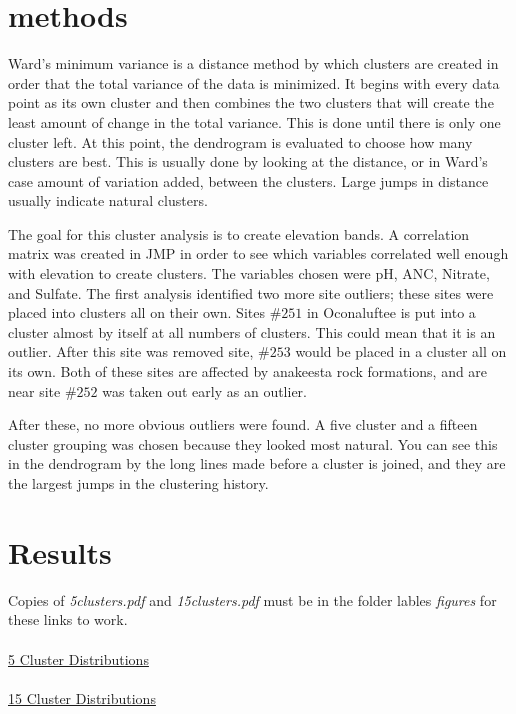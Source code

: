 \documentclass[11pt]{article} %
\begin{document}
\section{methods}
Ward’s minimum variance is a distance method by which clusters are created in order that the total variance of the data is minimized.  It begins with every data point as its own cluster and then combines the two clusters that will create the least amount of change in the total variance.  This is done until there is only one cluster left.  At this point, the dendrogram is evaluated to choose how many clusters are best.  This is usually done by looking at the distance, or in Ward’s case amount of variation added, between the clusters.  Large jumps in distance usually indicate natural clusters.

The goal for this cluster analysis is to create elevation bands.  A correlation matrix was created in JMP in order to see which variables correlated well enough with elevation to create clusters.  The variables chosen were pH, ANC, Nitrate, and Sulfate.   The first analysis identified two more site outliers; these sites were placed into clusters all on their own.  Sites $\#251$ in Oconaluftee is put into a cluster almost by itself at all numbers of clusters.  This could mean that it is an outlier.  After this site was removed site, $\#253$ would be placed in a cluster all on its own.  Both of these sites are affected by anakeesta rock formations, and are near site $\#252$ was taken out early as an outlier.

After these, no more obvious outliers were found.  A five cluster and a fifteen cluster grouping was chosen because they looked most natural.  You can see this in the dendrogram by the long lines made before a cluster is joined, and they are the largest jumps in the clustering history.

\section{Results}%
Copies of  {\it 5clusters.pdf} and {\it 15clusters.pdf} must be in the folder lables {\it figures} for these links to work.\\
\\
\href{run:figures/5clusters.pdf}{5 Cluster Distributions}\\
\\ 
\href{run:figures/15clusters.pdf}{15 Cluster Distributions}\\
\end{document}
